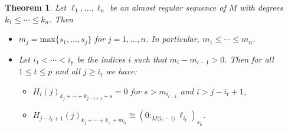 \documentclass[10pt,a4paper]{amsart}
\newtheorem{theorem}{Theorem}
\begin{document}
\begin{theorem}\label{thm:Ext Betti Gen}
    Let $\ell_1,\dots,\ell_n$ be an almost regular sequence of $M$ with degrees $k_1\leq \cdots \leq k_n$. Then
    \begin{itemize}
        \item[(a)] $m_j = \textrm{max}\{ s_1,\dots,s_j\}$ for $j=1,\dots,n$. In particular, $m_1\leq \cdots \leq m_n$.
        \item[(b)] Let $i_1<\cdots<i_p$ be the indices $i$ such that $m_i-m_{i-1} > 0$. Then for all $1\leq t \leq p$ and all $j\geq i_t$ we have:
        \begin{itemize}
            \item[(i)] $H_i(j)_{k_j+\cdots+k_{j-i+1}+s}=0$ for $s>m_{i_{t-1}}$ and $i>j-i_t+1$,
            \item[(ii)] $H_{j-i_t+1}(j)_{k_j+\cdots+ k_{i_t}+m_{i_t}} \cong (0:_{M\langle i_t -1 \rangle} \ell_{i_t})_{s_{i_t}}$.
        \end{itemize}
    \end{itemize}
\end{theorem}
\end{document}
